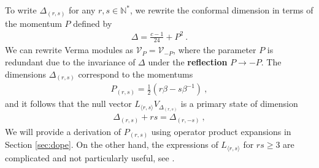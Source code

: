 \documentclass[12pt, a4paper]{article}
\newcommand{\myindex}[1]{\textbf{\boldmath #1}}
\begin{document}
To write $\Delta_{(r, s)}$ for any $r,s\in\mathbb{N}^*$, we rewrite the conformal dimension in terms of the momentum $P$ defined by 
\begin{align}
 \boxed{\Delta = \frac{c-1}{24} + P^2}\ .
 \label{dp}
\end{align}
We can rewrite Verma modules as $\mathcal{V}_P=\mathcal{V}_{-P}$, where the parameter $P$ is redundant due to the invariance of $\Delta$ under the \myindex{reflection} $P\to -P$. The dimensions $\Delta_{(r, s)}$ correspond to the momentums 
\begin{align}
 \boxed{P_{(r, s)} = \frac12\left(r\beta -s\beta^{-1}\right)}\ ,
 \label{prs}
\end{align}
and it follows that the null vector $L_{\langle r,s\rangle} V_{\Delta_{(r, s)}}$ is a primary state of dimension
\begin{align}
 \boxed{\Delta_{(r, s)} + rs = \Delta_{(r, -s)}}\ , 
 \label{drms}
\end{align}
We will provide a derivation of $P_{(r, s)}$ using operator product expansions in Section \ref{sec:dope}. On the other hand, the expressions of $L_{\langle r,s\rangle} $ for $rs\geq 3$ are complicated and not particularly useful, see \cite{wat24}.
\end{document}
